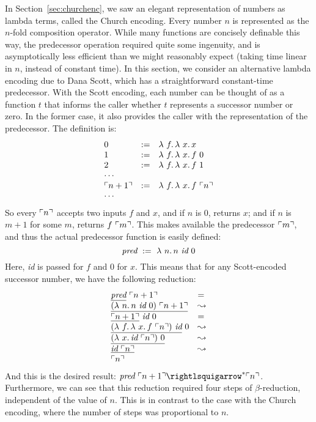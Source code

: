 In Section~\ref{sec:churchenc}, we saw an elegant representation of
numbers as lambda terms, called the Church encoding.  Every number $n$
is represented as the $n$-fold composition operator.  While many
functions are concisely definable this way, the predecessor operation
required quite some ingenuity, and is asymptotically less efficient
than we might reasonably expect (taking time linear in $n$, instead of
constant time).  In this section, we consider an alternative lambda
encoding due to Dana Scott, which has a straightforward constant-time
predecessor.  With the Scott encoding, each number can be thought of
as a function $t$ that informs the caller whether $t$ represents a
successor number or zero.  In the former case, it also provides the
caller with the representation of the predecessor. The definition is:
\[
\begin{array}{lll}
  0 & := & \lam{f}{\lam{x}{x}} \\
  1 & := & \lam{f}{\lam{x}{f\ 0}} \\
  2 & := & \lam{f}{\lam{x}{f\ 1}} \\
  \multicolumn{3}{l}{\cdots} \\
  \rep{n+1} & := & \lam{f}{\lam{x}{f\ \rep{n}}} \\
  \multicolumn{3}{l}{\cdots} 
\end{array}
\]
So every $\ulcorner n \urcorner$ accepts two inputs $f$ and $x$, and if
$n$ is $0$, returns $x$; and if $n$ is $m+1$ for some $m$, returns
$f\ \ulcorner m \urcorner$.  This makes available the predecessor $\ulcorner m \urcorner$, and
thus the actual predecessor function is easily defined:
\[
\textit{pred} \ := \ \lam{n}{n\ \textit{id}\ 0}
\]
\noindent Here, \textit{id} is passed for $f$ and $0$ for $x$.  This means
that for any Scott-encoded successor number, we have the following reduction:
\[
\begin{array}{ll}
  \underline{\textit{pred}}\ \ulcorner n+1 \urcorner & = \\
\underline{(\lambda\ n.\, n\ \textit{id}\ 0)\ \ulcorner n+1 \urcorner} & \leadsto \\
\underline{\ulcorner n+1 \urcorner}\ \textit{id}\ 0 & = \\
\underline{(\lambda\ f.\, \lambda\ x.\, f\ \ulcorner n \urcorner)\ \textit{id}}\ 0 & \leadsto \\
\underline{(\lambda\ x.\, \textit{id}\ \ulcorner n \urcorner)\ 0} & \leadsto \\
\underline{\textit{id}\ \ulcorner n \urcorner} & \leadsto \\
\ulcorner n \urcorner & \
\end{array}
\]
\noindent And this is the desired result: $\textit{pred}\ \rep{n+1}
\betaa^* \rep{n}$.  Furthermore, we can see that this reduction required
four steps of $\beta$-reduction, independent of the value of $n$.
This is in contrast to the case with the Church encoding, where the
number of steps was proportional to $n$.

